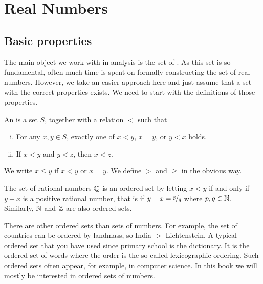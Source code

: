 \chapter{Real Numbers} \label{rn:chapter}


\section{Basic properties} \label{sec:basicpropsrn}


The main object we work with in analysis is the set of
.  As this set is so fundamental, often much time is
spent on formally constructing the set of real numbers.  However, we 
take an easier approach here and just assume that a set with the correct
properties exists.  We need to start with the definitions of those
properties.

\begin{defn}
An \emph{} is a set $S$, together with
a relation $<$ such that
\begin{enumerate}[(i)]
\item For any $x, y \in S$, exactly one of
$x < y$, $x=y$, or $y < x$ holds.
\item If $x < y$ and $y < z$, then $x < z$.
\end{enumerate}
We write $x \leq y$ if $x < y$ or $x=y$.  We define
$>$ and $\geq$ in the obvious way.
\end{defn}


The set of rational numbers ${\mathbb{Q}}$ is an ordered set by letting
$x < y$ if and only if $y-x$ is a positive rational number, that is
if $y-x = \nicefrac{p}{q}$ where $p,q \in {\mathbb{N}}$.  Similarly,
${\mathbb{N}}$ and ${\mathbb{Z}}$ are also ordered sets.

There are other ordered sets than sets of numbers.  For example, the
set of countries can be ordered by landmass, so India $>$
Lichtenstein.
A typical ordered set that you have used since primary school is the
dictionary.  It is the ordered set of words where the order is the
so-called lexicographic ordering.  Such ordered sets often appear, for
example, in
computer science.  In this book we will mostly be interested in ordered
sets of numbers.

